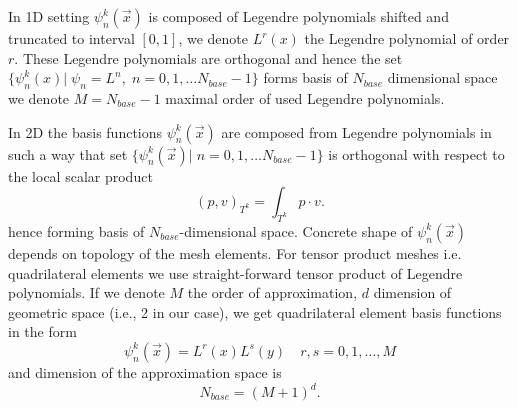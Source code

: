 In 1D setting $\psi_n^k(\vec{x})$ is composed of Legendre polynomials shifted 
and truncated to interval $[0, 1]$, we denote $L^r(x)$ the Legendre 
polynomial of order $r$. These Legendre polynomials are orthogonal and hence 
the set  $\{\psi_n^k(x)| \; \psi_n = L^n, \; n = 0,1, \dots  N_{base} - 
1\}$ forms basis of  $N_{base}$ dimensional space we denote $M = N_{base} - 
1$ maximal order of used Legendre polynomials.

In 2D the basis functions $\psi_n^k(\vec{x})$ are composed from Legendre 
polynomials  in such a way that set $\{\psi_n^k(\vec{x})| \; n = 0,1, \dots  
N_{base} - 1\}$ is orthogonal with respect to the local 
scalar product
\begin{equation}
    \label{eq:scalar_prod_dk}
    (p, v)_{T^k} = \int_{T^k} p \cdot v.
\end{equation}
hence forming basis of $N_{base}$-dimensional space. Concrete shape of 
$\psi_n^k(\vec{x})$ depends on topology of the mesh elements. For 
tensor product meshes i.e. quadrilateral elements we use straight-forward 
tensor product of Legendre polynomials. If we denote $M$ the order of 
approximation, $d$ dimension of geometric space (i.e., 2 in our case), we get 
quadrilateral element basis functions in the form
\begin{equation}
\psi_n^k(\vec{x}) = L^r(x)L^s(y)\quad r, s = 0,1, \dots, M
\end{equation}
and dimension of the approximation space is
\begin{equation}
    N_{base} = (M + 1)^d.
\end{equation}

